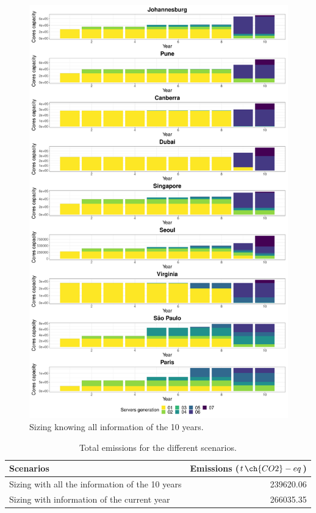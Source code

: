 \begin{figure}
\centering
  \includegraphics[width=\linewidth]{images/dc_evolution_optimal.pdf}
  \caption{Sizing knowing all information of the 10 years.}
  \label{fig:dc_evolution_optimal}
\end{figure}

\begin{table}[!ht]
  
\caption{Total emissions for the different scenarios.}\label{tab:emissions_sizing} \centering

\begin{tabular}{|l|r|}
  \hline
  \textbf{Scenarios} & \textbf{Emissions ($t\,\ch{CO2}-eq$)}   \\
  \hline  
   Sizing with all the information of the 10 years  & 239620.06     \\  
  \hline
  Sizing with information of the current year       & 266035.35     \\
  \hline

\end{tabular}
\end{table}


